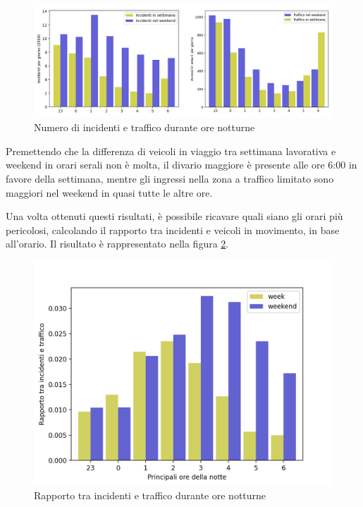 \documentclass[a4paper]{report}
\begin{document}
\begin{figure}
    \includegraphics[width=\linewidth]{img_unite/ore_punta.png}
    \caption{Numero di incidenti e traffico durante ore notturne}
    \label{fig:ore-notte}
\end{figure}

Premettendo che la differenza di veicoli in viaggio tra settimana lavorativa e 
weekend in orari serali non è molta, il divario maggiore è presente alle ore 6:00 
in favore della settimana, mentre gli ingressi nella zona a traffico limitato 
sono maggiori nel weekend in quasi tutte le altre ore. 

Una volta ottenuti questi risultati, è possibile ricavare quali siano gli orari
più pericolosi, calcolando il rapporto tra incidenti e veicoli in movimento, 
in base all'orario. 
Il risultato è rappresentato nella figura \ref{fig:rapp-inc-traff}. 

\begin{figure}
    \includegraphics[width=\linewidth]{../src/area_c/rapporto_inc_notte.png}
    \caption{Rapporto tra incidenti e traffico durante ore notturne}
    \label{fig:rapp-inc-traff}
\end{figure}
\end{document}
